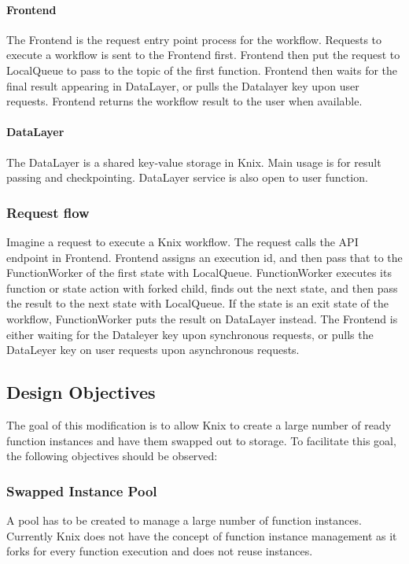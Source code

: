 \documentclass[conference]{IEEEtran}
\begin{document}
\paragraph{Frontend}\label{frontend}
The Frontend is the request entry point process for the workflow. Requests to execute a workflow is sent to the Frontend first. Frontend then put the request to LocalQueue to pass to the topic of the first function. Frontend then waits for the final result appearing in DataLayer, or pulls the Datalayer key upon user requests. Frontend returns the workflow result to the user when available.

\paragraph{DataLayer}\label{dataLayer}
The DataLayer is a shared key-value storage in Knix. Main usage is for result passing and checkpointing. DataLayer service is also open to user function.

\subsubsection{Request flow}

Imagine a request to execute a Knix workflow. The request calls the API endpoint in Frontend. Frontend assigns an execution id, and then pass that to the FunctionWorker of the first state with LocalQueue. FunctionWorker executes its function or state action with forked child, finds out the next state, and then pass the result to the next state with LocalQueue. If the state is an exit state of the workflow, FunctionWorker puts the result on DataLayer instead.  The Frontend is either waiting for the Dataleyer key upon synchronous requests, or pulls the DataLeyer key on user requests upon asynchronous requests. 

\subsection{Design Objectives}
The goal of this modification is to allow Knix to create a large number of ready function instances and have them swapped out to storage. To facilitate this goal, the following objectives should be observed:

\subsubsection{Swapped Instance Pool}
A pool has to be created to manage a large number of function instances. Currently Knix does not have the concept of function instance management as it forks for every function execution and does not reuse instances.
\end{document}
